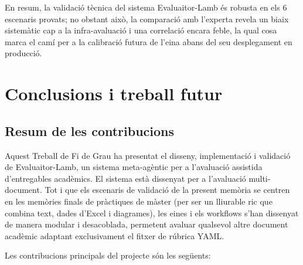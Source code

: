 \documentclass[12pt,a4paper,twoside]{report}
\begin{document}
En resum, la validaci\'o t\`ecnica del sistema Evaluaitor-Lamb \'es robusta en els 6 escenaris provats; no obstant aix\`o, la comparaci\'o amb l'experta revela un biaix sistem\`atic cap a la infra-avaluaci\'o i una correlaci\'o encara feble, la qual cosa marca el cam\'i per a la calibraci\'o futura de l'eina abans del seu desplegament en producci\'o.

\chapter{Conclusions i treball futur}
\label{chap:conclusions}

\section{Resum de les contribucions}
\label{sec:contribucions}

Aquest Treball de Fi de Grau ha presentat el disseny, implementaci\'o i validaci\'o de Evaluaitor-Lamb, un sistema meta-ag\`entic per a l'avaluaci\'o assistida d'entregables acad\`emics. El sistema est\`a dissenyat per a l'avaluaci\'o multi-document. Tot i que els escenaris de validaci\'o de la present mem\`oria se centren en les mem\`ories finals de pr\`actiques de m\`aster (per ser un lliurable ric que combina text, dades d'Excel i diagrames), les eines i els workflows s'han dissenyat de manera modular i desacoblada, permetent avaluar qualsevol altre document acad\`emic adaptant exclusivament el fitxer de r\'ubrica YAML.

Les contribucions principals del projecte s\'on les seg\"uents:
\end{document}
